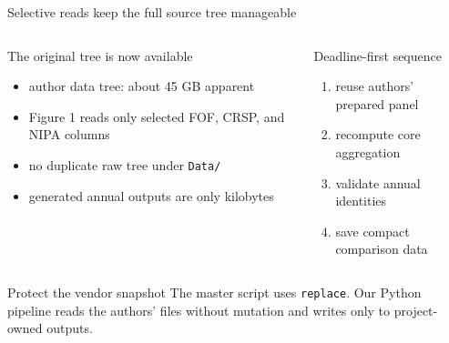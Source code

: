 \begin{frame}{Selective reads keep the full source tree manageable}
  \begin{columns}[T,onlytextwidth]
    \begin{block}{The original tree is now available}
      \begin{itemize}
        \item author data tree: about 45 GB apparent
        \item Figure 1 reads only selected FOF, CRSP, and NIPA columns
        \item no duplicate raw tree under \texttt{Data/}
        \item generated annual outputs are only kilobytes
      \end{itemize}
    \end{block}

    \begin{block}{Deadline-first sequence}
      \begin{enumerate}
        \item reuse authors' prepared panel
        \item recompute core aggregation
        \item validate annual identities
        \item save compact comparison data
      \end{enumerate}
    \end{block}
  \end{columns}

  \vspace{0.15cm}
  \begin{alertblock}{Protect the vendor snapshot}
    The master script uses \texttt{replace}. Our Python pipeline reads the
    authors' files without mutation and writes only to project-owned outputs.
  \end{alertblock}
\end{frame}
